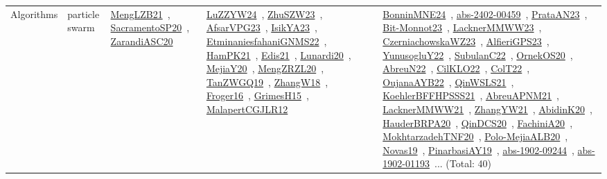 {\begin{longtable}{lp{3cm}>{\raggedright\arraybackslash}p{6cm}>{\raggedright\arraybackslash}p{6cm}>{\raggedright\arraybackslash}p{8cm}}
\index{particle swarm}\index{Algorithms!particle swarm}Algorithms & particle swarm & \href{../works/MengLZB21.pdf}{MengLZB21}~\cite{MengLZB21}, \href{../works/SacramentoSP20.pdf}{SacramentoSP20}~\cite{SacramentoSP20}, \href{../works/ZarandiASC20.pdf}{ZarandiASC20}~\cite{ZarandiASC20} & \href{../works/LuZZYW24.pdf}{LuZZYW24}~\cite{LuZZYW24}, \href{../works/ZhuSZW23.pdf}{ZhuSZW23}~\cite{ZhuSZW23}, \href{../works/AfsarVPG23.pdf}{AfsarVPG23}~\cite{AfsarVPG23}, \href{../works/IsikYA23.pdf}{IsikYA23}~\cite{IsikYA23}, \href{../works/EtminaniesfahaniGNMS22.pdf}{EtminaniesfahaniGNMS22}~\cite{EtminaniesfahaniGNMS22}, \href{../works/HamPK21.pdf}{HamPK21}~\cite{HamPK21}, \href{../works/Edis21.pdf}{Edis21}~\cite{Edis21}, \href{../works/Lunardi20.pdf}{Lunardi20}~\cite{Lunardi20}, \href{../works/MejiaY20.pdf}{MejiaY20}~\cite{MejiaY20}, \href{../works/MengZRZL20.pdf}{MengZRZL20}~\cite{MengZRZL20}, \href{../works/TanZWGQ19.pdf}{TanZWGQ19}~\cite{TanZWGQ19}, \href{../works/ZhangW18.pdf}{ZhangW18}~\cite{ZhangW18}, \href{../works/Froger16.pdf}{Froger16}~\cite{Froger16}, \href{../works/GrimesH15.pdf}{GrimesH15}~\cite{GrimesH15}, \href{../works/MalapertCGJLR12.pdf}{MalapertCGJLR12}~\cite{MalapertCGJLR12} & \href{../works/BonninMNE24.pdf}{BonninMNE24}~\cite{BonninMNE24}, \href{../works/abs-2402-00459.pdf}{abs-2402-00459}~\cite{abs-2402-00459}, \href{../works/PrataAN23.pdf}{PrataAN23}~\cite{PrataAN23}, \href{../works/Bit-Monnot23.pdf}{Bit-Monnot23}~\cite{Bit-Monnot23}, \href{../works/LacknerMMWW23.pdf}{LacknerMMWW23}~\cite{LacknerMMWW23}, \href{../works/CzerniachowskaWZ23.pdf}{CzerniachowskaWZ23}~\cite{CzerniachowskaWZ23}, \href{../works/AlfieriGPS23.pdf}{AlfieriGPS23}~\cite{AlfieriGPS23}, \href{../works/YunusogluY22.pdf}{YunusogluY22}~\cite{YunusogluY22}, \href{../works/SubulanC22.pdf}{SubulanC22}~\cite{SubulanC22}, \href{../works/OrnekOS20.pdf}{OrnekOS20}~\cite{OrnekOS20}, \href{../works/AbreuN22.pdf}{AbreuN22}~\cite{AbreuN22}, \href{../works/CilKLO22.pdf}{CilKLO22}~\cite{CilKLO22}, \href{../works/ColT22.pdf}{ColT22}~\cite{ColT22}, \href{../works/OujanaAYB22.pdf}{OujanaAYB22}~\cite{OujanaAYB22}, \href{../works/QinWSLS21.pdf}{QinWSLS21}~\cite{QinWSLS21}, \href{../works/KoehlerBFFHPSSS21.pdf}{KoehlerBFFHPSSS21}~\cite{KoehlerBFFHPSSS21}, \href{../works/AbreuAPNM21.pdf}{AbreuAPNM21}~\cite{AbreuAPNM21}, \href{../works/LacknerMMWW21.pdf}{LacknerMMWW21}~\cite{LacknerMMWW21}, \href{../works/ZhangYW21.pdf}{ZhangYW21}~\cite{ZhangYW21}, \href{../works/AbidinK20.pdf}{AbidinK20}~\cite{AbidinK20}, \href{../works/HauderBRPA20.pdf}{HauderBRPA20}~\cite{HauderBRPA20}, \href{../works/QinDCS20.pdf}{QinDCS20}~\cite{QinDCS20}, \href{../works/FachiniA20.pdf}{FachiniA20}~\cite{FachiniA20}, \href{../works/MokhtarzadehTNF20.pdf}{MokhtarzadehTNF20}~\cite{MokhtarzadehTNF20}, \href{../works/Polo-MejiaALB20.pdf}{Polo-MejiaALB20}~\cite{Polo-MejiaALB20}, \href{../works/Novas19.pdf}{Novas19}~\cite{Novas19}, \href{../works/PinarbasiAY19.pdf}{PinarbasiAY19}~\cite{PinarbasiAY19}, \href{../works/abs-1902-09244.pdf}{abs-1902-09244}~\cite{abs-1902-09244}, \href{../works/abs-1902-01193.pdf}{abs-1902-01193}~\cite{abs-1902-01193}... (Total: 40)\\

\end{longtable}}
